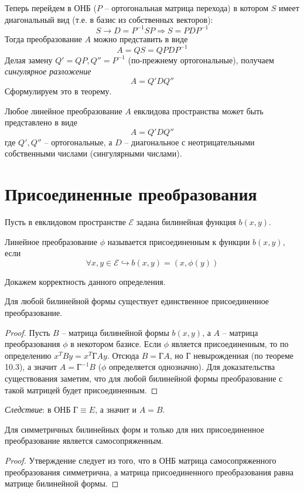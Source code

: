 Теперь перейдем в ОНБ ($P$ -- ортогональная матрица перехода) в котором $S$ имеет диагональный вид (т.е. в базис из собственных векторов):
\[
S\to D=P^{-1}SP \Rightarrow S=PDP^{-1}
\]
Тогда преобразование $A$ можно представить в виде
\[
A=QS=QPDP^{-1}
\]
Делая замену $Q'=QP, Q''=P^{-1}$ (по-прежнему ортогональные), получаем \textit{сингулярное разложение}
\[
A=Q'DQ''
\]
Сформулируем это в теорему.
\begin{theorem}
    Любое линейное преобразование $A$ евклидова пространства может быть представлено в виде 
    \[
    A=Q'DQ''
    \]
    где $Q',Q''$ -- ортогональные, а $D$ -- диагональное с неотрицательными собственными числами (сингулярными числами).
\end{theorem}

\section{Присоединенные преобразования}
Пусть в евклидовом пространстве $\mathcal{E}$ задана билинейная функция $b(x,y)$.
\begin{definition}
    Линейное преобразование $\phi$ называется присоединенным к функции $b(x,y)$, если 
    \[
    \forall x,y\in\mathcal{E}\hookrightarrow b(x,y)=(x,\phi(y))
    \]
\end{definition}

Докажем корректность данного определения.
\begin{theorem}
    Для любой билинейной формы существует единственное присоединенное преобразование.
\end{theorem}
\begin{proof}
    Пусть $B$ -- матрица билинейной формы $b(x,y)$, а $A$ -- матрица преобразования $\phi$ в некотором базисе. Если $\phi$ является присоединенным, то по определению $x^TBy=x^T\text{Г}Ay$. Отсюда $B=\text{Г}A$, но $\text{Г}$ невырожденная (по теореме 10.3), а значит $A=\text{Г}^{-1}B$ ($\phi$ определяется однозначно). Для доказательства существования заметим, что для любой билинейной формы преобразование с такой матрицей будет присоединенным. 
\end{proof}

\textit{Следствие}: в ОНБ $\text{Г}\equiv E$, а значит и $A=B$.
\begin{theorem}
    Для симметричных билинейных форм и только для них присоединенное преобразование является самосопряженным.
\end{theorem}
\begin{proof}
    Утверждение следует из того, что в ОНБ матрица самосопряженного преобразования симметрична, а матрица присоединенного преобразования равна матрице билинейной формы.
\end{proof}

